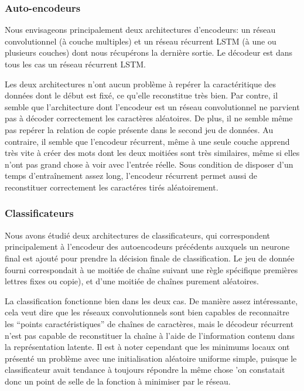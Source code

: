 \documentclass[a4paper, 11pt, onecolumn]{article}
\begin{document}
\subsubsection{Auto-encodeurs}

Nous envisageons principalement deux architectures d'encodeurs: un réseau
convolutionnel (à couche multiples) et un réseau récurrent LSTM (à une ou plusieurs
couches) dont nous récupérons la dernière sortie. Le décodeur est dans tous les
cas un réseau récurrent LSTM.

Les deux architectures n'ont aucun problème à repérer la caractéritique des données dont le
début est fixé, ce qu'elle reconstitue très bien. Par contre, il semble que l'architecture dont l'encodeur est un
réseau convolutionnel ne parvient pas à décoder correctement les caractères
aléatoires. De plus, il ne semble même pas repérer la relation de \og copie\fg
présente dans le second jeu de données. Au contraire, il semble que l'encodeur
récurrent, même à une seule couche apprend très vite à créer des mots dont les
deux moitiées sont très similaires, même si elles n'ont pas grand chose à voir
avec l'entrée réelle. Sous condition de disposer d'un temps d'entraînement assez
long, l'encodeur récurrent permet aussi de reconstituer correctement les
caractéres tirés aléatoirement.

\subsubsection{Classificateurs}

Nous avons étudié deux architectures de classificateurs, qui correspondent
principalement à l'encodeur des autoencodeurs précédents auxquels un neurone
final est ajouté pour prendre la décision finale de classification. Le jeu de
donnée fourni correspondait à ue moitiée de chaîne suivant une règle spécifique
premières lettres fixes ou copie), et d'une moitiée de chaînes purement aléatoires.

La classification fonctionne bien dans les deux cas. De manière assez
intéressante, cela veut dire que les réseaux convolutionnels sont bien capables
de reconnaitre les ``points caractéristiques'' de chaînes de caractères, mais le
décodeur récurrent n'est pas capable de reconstituer la chaîne à l'aide de
l'information contenu dans la représentation latente. Il est à noter cependant
que les minimums locaux ont présenté un problème avec une initialisation
aléatoire uniforme simple, puisque le classificateur avait tendance à toujours
répondre la même chose 'on constatait donc un point de selle de la fonction à
minimiser par le réseau.
\end{document}
